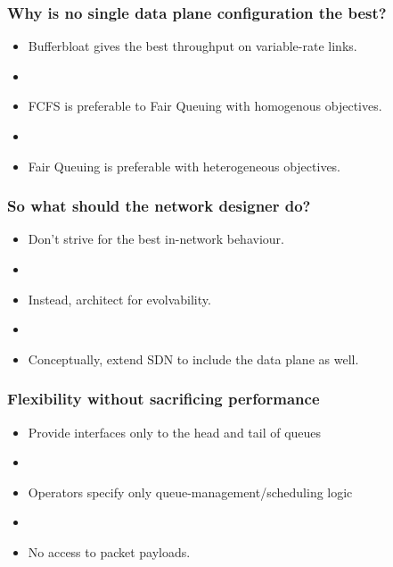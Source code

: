 \begin{Large}
\begin{frame}[plain]
\frametitle{Why is no single data plane configuration the best?}
\begin{itemize}
\item Bufferbloat gives the best throughput on variable-rate links.
\item[] 

\item FCFS is preferable to Fair Queuing with homogenous objectives.

\item[]

\item Fair Queuing is preferable with heterogeneous objectives.
\end{itemize}
\end{frame}

\begin{frame}[plain]
\frametitle{So what should the network designer do?}
\begin{itemize}
\item Don't strive for the best in-network behaviour.
\item []
\item Instead, architect for evolvability. 
\item []
\item Conceptually, extend SDN to include the data plane as well.
\end{itemize}
\end{frame}

\begin{frame}[plain]
\frametitle{Flexibility without sacrificing performance}


\begin{itemize}
\item Provide interfaces only to the head and tail of queues
\item[]
\item Operators specify only queue-management/scheduling logic
\item[]
\item No access to packet payloads.
\end{itemize}
\end{frame}


\end{Large}
